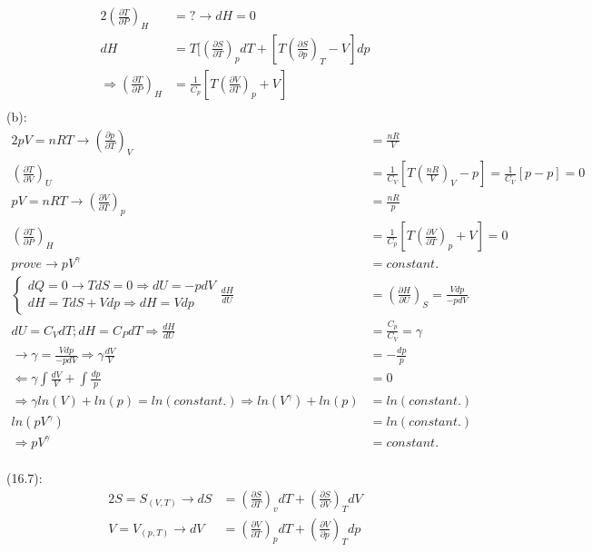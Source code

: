 \begin{latin}
    \begin{alignat*}{2}
    (\frac{\partial T}{\partial P}) _H &= ? \to dH = 0\\
    dH &= T[(\frac{\partial S}{\partial T})_p dT + [T(\frac{\partial S}{\partial p})_T  -V]dp\\
    \Longrightarrow(\frac{\partial T}{\partial P}) _H &= \frac{1}{C_p}[T(\frac{\partial V}{\partial T})_p  +V]\\
    \end{alignat*}
    (b):
    \begin{alignat*}{2}
        pV = nRT \to (\frac{\partial p}{\partial T})_V &= \frac{nR}{V}\\
        (\frac{\partial T}{\partial V})_U &= \frac{1}{C_V}  [T(\frac{nR}{V})_V -p] = \frac{1}{C_V}[p - p] = 0\\
        pV = nRT \to (\frac{\partial V}{\partial T})_p &= \frac{nR}{p}\\
        (\frac{\partial T}{\partial P}) _H &= \frac{1}{C_p}[T(\frac{\partial V}{\partial T})_p  +V] = 0\\
        prove \to pV^{\gamma} &= constant.\\
        \begin{cases}
            dQ = 0 \to TdS = 0 \Rightarrow dU = -pdV\\
            dH = TdS + Vdp \Rightarrow dH = Vdp
        \end{cases}
        \frac{dH}{dU} &= (\frac{\partial H}{\partial U})_S = \frac{Vdp}{-pdV}\\
        dU = C_V dT ; dH = C_P dT \Rightarrow \frac{dH}{dU} &= \frac{C_p}{C_V} = \gamma \\
        \to \gamma = \frac{Vdp}{-pdV} \Rightarrow \gamma \frac{dV}{V} &= -\frac{dp}{p}\\
        \Longleftarrow \gamma \int \frac{dV}{V} + \int \frac{dp}{p} &= 0\\
        \Longrightarrow \gamma ln(V)+ ln(p) = ln(constant.)\Rightarrow  ln(V^{\gamma})+ ln(p) &= ln(constant.)\\
        ln(pV^{\gamma}) &= ln(constant.)\\
        \Longrightarrow pV^{\gamma} &= constant.
    \end{alignat*}\\
    (16.7):
    \begin{alignat*}{2}
        S = S_(V,T) \to dS &= (\frac{\partial S}{\partial T})_v dT + (\frac{\partial S}{\partial V})_T dV \\
        V = V_(p,T) \to dV &= (\frac{\partial V}{\partial T})_p dT + (\frac{\partial V}{\partial p})_T dp \\

\end{alignat*}
\end{latin}
